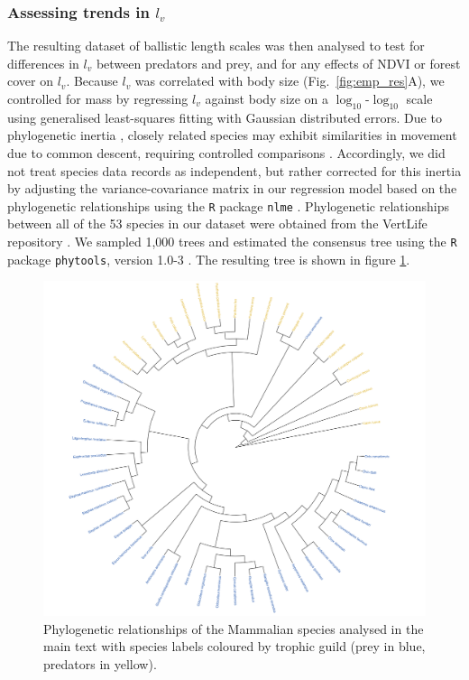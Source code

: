 \documentclass[12pt]{article}
\begin{document}
\subsubsection*{Assessing trends in $l_v$}

The resulting dataset of ballistic length scales was then analysed to test for differences in $l_v$ between predators and prey, and for any effects of NDVI or forest cover on $l_v$. Because $l_v$ was correlated with body size (Fig.~\ref{fig:emp_res}A), we controlled for mass by regressing $l_v$ against body size on a $\log_{10}$-$\log_{10}$ scale using generalised least-squares fitting with Gaussian distributed errors. Due to phylogenetic inertia \cite{Hansen:2005cg}, closely related species may exhibit similarities in movement due to common descent, requiring controlled comparisons \cite{Harvey:1991uo}. Accordingly, we did not treat species data records as independent, but rather corrected for this inertia by adjusting the variance-covariance matrix in our regression model based on the phylogenetic relationships using the \texttt{R} package \texttt{nlme} \cite{Pinheiro:2018}. Phylogenetic relationships between all of the 53 species in our dataset were obtained from the VertLife repository \cite{Upham:2019}. We sampled 1,000 trees and estimated the consensus tree using the \texttt{R} package \texttt{phytools}, version 1.0-3 \cite{Revell:2012}. The resulting tree is shown in figure \ref{fig:phylogeny}. %

\begin{figure}[!h]
\centering
\includegraphics[scale=1]{Phylogeny.png}
\caption{Phylogenetic relationships of the Mammalian species analysed in the main text with species labels coloured by trophic guild (prey in blue, predators in yellow).}
\label{fig:phylogeny}
\end{figure}
\end{document}
